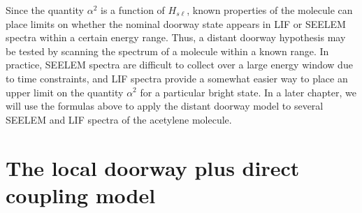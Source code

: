 Since the quantity $\alpha^2$ is a function of $H_{s\ell}$, known
properties of the molecule can place limits on whether the nominal
doorway state appears in LIF or SEELEM spectra within a certain energy
range.  Thus, a distant doorway hypothesis may be tested by scanning
the spectrum of a molecule within a known range.  In practice, SEELEM
spectra are difficult to collect over a large energy window due to
time constraints, and LIF spectra provide a somewhat easier way to
place an upper limit on the quantity $\alpha^2$ for a particular
bright state.  In a later chapter, we will use the formulas above to
apply the distant doorway model to several SEELEM and LIF spectra of
the acetylene molecule.

\section{The local doorway plus direct coupling model}
\label{sec:model-local-plus-direct}

